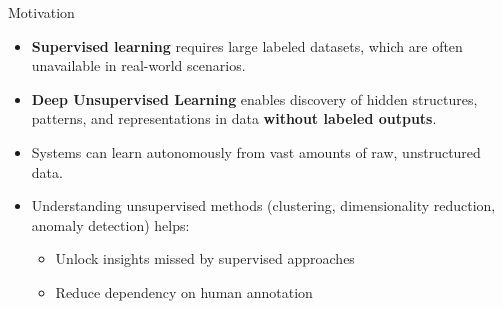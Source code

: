 \begin{frame}{Motivation}
    \begin{itemize}
        \item \textbf{Supervised learning} requires large labeled datasets, which are often unavailable in real-world scenarios.
        \item \textbf{Deep Unsupervised Learning} enables discovery of hidden structures, patterns, and representations in data \textbf{without labeled outputs}.
        \item Systems can learn autonomously from vast amounts of raw, unstructured data.
        \item Understanding unsupervised methods (clustering, dimensionality reduction, anomaly detection) helps:
        \begin{itemize}
            \item Unlock insights missed by supervised approaches
            \item Reduce dependency on human annotation
        \end{itemize}
    \end{itemize}
\end{frame}

